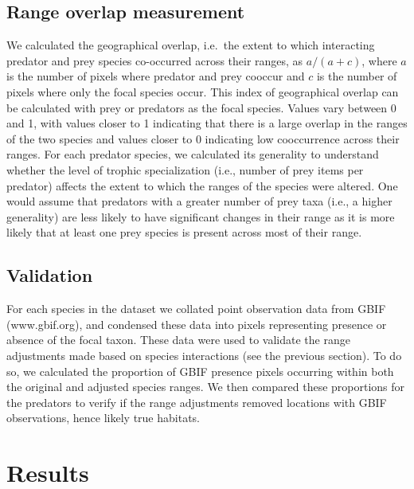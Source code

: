 \documentclass[10pt,oneside]{article}
\begin{document}
\hypertarget{range-overlap-measurement}{%
\subsection{Range overlap measurement}\label{range-overlap-measurement}}

We calculated the geographical overlap, i.e.~the extent to which
interacting predator and prey species co-occurred across their ranges,
as \(a/(a + c)\), where \(a\) is the number of pixels where predator and
prey cooccur and \(c\) is the number of pixels where only the focal
species occur. This index of geographical overlap can be calculated with
prey or predators as the focal species. Values vary between 0 and 1,
with values closer to 1 indicating that there is a large overlap in the
ranges of the two species and values closer to 0 indicating low
cooccurrence across their ranges. For each predator species, we
calculated its generality to understand whether the level of trophic
specialization (i.e., number of prey items per predator) affects the
extent to which the ranges of the species were altered. One would assume
that predators with a greater number of prey taxa (i.e., a higher
generality) are less likely to have significant changes in their range
as it is more likely that at least one prey species is present across
most of their range.

\hypertarget{validation}{%
\subsection{Validation}\label{validation}}

For each species in the dataset we collated point observation data from
GBIF (www.gbif.org), and condensed these data into pixels representing
presence or absence of the focal taxon. These data were used to validate
the range adjustments made based on species interactions (see the
previous section). To do so, we calculated the proportion of GBIF
presence pixels occurring within both the original and adjusted species
ranges. We then compared these proportions for the predators to verify
if the range adjustments removed locations with GBIF observations, hence
likely true habitats.

\hypertarget{results}{%
\section{Results}\label{results}}
\end{document}
